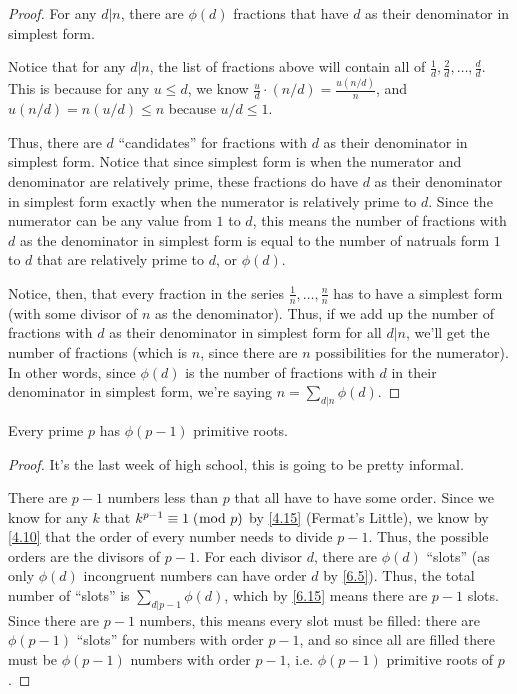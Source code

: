 \documentclass[../main.tex]{subfiles}
\begin{document}
\begin{proof}
  For any $d | n$, there are $\phi(d)$ fractions that have $d$ as their denominator in simplest form.

  Notice that for any $d | n$, the list of fractions above will contain all of $\frac{1}{d}, \frac{2}{d}, \ldots, \frac{d}{d}$. This is because for any $u \leq d$, we know $\frac{u}{d} \cdot (n/d) = \frac{u(n/d)}{n}$, and $u(n/d) = n(u/d) \leq n$ because $u/d \leq 1$.

  Thus, there are $d$ ``candidates'' for fractions with $d$ as their denominator in simplest form. Notice that since simplest form is when the numerator and denominator are relatively prime, these fractions do have $d$ as their denominator in simplest form exactly when the numerator is relatively prime to $d$. Since the numerator can be any value from $1$ to $d$, this means the number of fractions with $d$ as the denominator in simplest form is equal to the number of natruals form $1$ to $d$ that are relatively prime to $d$, or $\phi(d)$.

  Notice, then, that every fraction in the series $\frac{1}{n}, \ldots, \frac{n}{n}$ has to have a simplest form (with some divisor of $n$ as the denominator). Thus, if we add up the number of fractions with $d$ as their denominator in simplest form for all $d | n$, we'll get the number of fractions (which is $n$, since there are $n$ possibilities for the numerator). In other words, since $\phi(d)$ is the number of fractions with $d$ in their denominator in simplest form, we're saying $n = \sum_{d | n} \phi(d)$.
\end{proof}



\begin{thm} \label{6.17}
  Every prime $p$ has $\phi(p-1)$ primitive roots.
\end{thm}

\begin{proof}
  It's the last week of high school, this is going to be pretty informal.

  There are $p-1$ numbers less than $p$ that all have to have some order. Since we know for any $k$ that $k^{p-1} \equiv 1 \; (\bmod \; p)$ by \ref{4.15} (Fermat's Little), we know by \ref{4.10} that the order of every number needs to divide $p-1$. Thus, the possible orders are the divisors of $p-1$. For each divisor $d$, there are $\phi(d)$ ``slots'' (as only $\phi(d)$ incongruent numbers can have order $d$ by \ref{6.5}).
  Thus, the total number of ``slots'' is $\sum_{d|p-1} \phi(d)$, which by \ref{6.15} means there are $p-1$ slots. Since there are $p-1$ numbers, this means every slot must be filled: there are $\phi(p-1)$ ``slots'' for numbers with order $p-1$, and so since all are filled there must be $\phi(p-1)$ numbers with order $p-1$, i.e. $\phi(p-1)$ primitive roots of $p$.
\end{proof}
\end{document}
